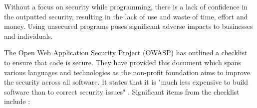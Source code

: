 Without a focus on security while programming, there is a lack of confidence in the outputted security, resulting in the lack of use and waste of time, effort and money. Using unsecured programs poses significant adverse impacts to businesses and individuals.  
\newline
\par The Open Web Application Security Project (OWASP) has outlined a checklist to ensure that code is secure. They have provided this document which spans various languages and technologies as the non-profit foundation aims to improve the security across all software. It states that it is "much less expensive to build software than to correct security issues" \cite{owasp}.
\newline
\newline
Significant items from the checklist include \cite{owasp}: 

